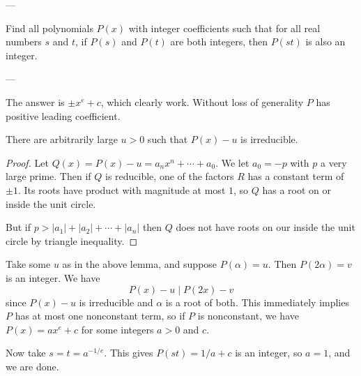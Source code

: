 
---

Find all polynomials $P(x)$ with integer coefficients such that for all real numbers $s$ and $t$, if $P(s)$ and $P(t)$ are both integers, then $P(st)$ is also an integer.

---

The answer is $\pm x^e+c$, which clearly work. Without loss of generality $P$ has positive leading coefficient.
\begin{boxlemma*}[MOP 2007]
    There are arbitrarily large $u>0$ such that $P(x)-u$ is irreducible.
\end{boxlemma*}
\begin{proof}
    Let $Q(x)=P(x)-u=a_nx^n+\cdots+a_0$. We let $a_0=-p$ with $p$ a very large prime. Then if $Q$ is reducible, one of the factors $R$ has a constant term of $\pm1$. Its roots have product with magnitude at most $1$, so $Q$ has a root on or inside the unit circle.

    But if $p>|a_1|+|a_2|+\cdots+|a_n|$ then $Q$ does not have roots on our inside the unit circle by triangle inequality.
\end{proof}

Take some $u$ as in the above lemma, and suppose $P(\alpha)=u$. Then $P(2\alpha)=v$ is an integer. We have \[P(x)-u\mid P(2x)-v\]
since $P(x)-u$ is irreducible and $\alpha$ is a root of both. This immediately implies $P$ has at most one nonconstant term, so if $P$ is nonconstant, we have $P(x)=ax^e+c$ for some integers $a>0$ and $c$.

Now take $s=t=a^{-1/e}$. This gives $P(st)=1/a+c$ is an integer, so $a=1$, and we are done.


